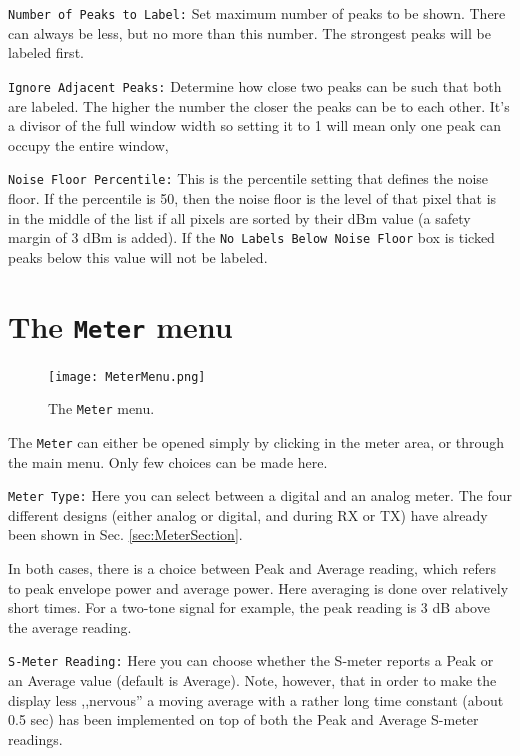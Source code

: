 \documentclass[12pt]{book}
\def\rett#1{\texttt{\color{red}#1}}
\def\bltt#1{\texttt{\color{blue}#1}}
\begin{document}
\rett{Number of Peaks to Label:} Set maximum number of peaks to be shown. There can always be less,
but no more than this number. The strongest peaks will be labeled first.

\rett{Ignore Adjacent Peaks:} Determine how close two peaks can be such that both are labeled.
The higher the number the closer the peaks can be to each other. It's a divisor of the
full window width so setting it to 1 will mean only one peak can occupy the entire window,

\rett{Noise Floor Percentile:} This is the percentile setting that defines the noise floor. If the
percentile is 50, then the noise floor is the level of that pixel that is in the middle of the list
if all pixels are sorted by their dBm value (a safety margin of 3 dBm is added).
If the \rett{No Labels Below Noise Floor} box is ticked
peaks below this value will not be labeled.


\section{The \texttt{Meter} menu}

\begin{figure}[ht]
\center
\texttt{[image: MeterMenu.png]}
\caption{The \bltt{Meter} menu.}
\label{fig:Meter}
\end{figure}

The \bltt{Meter} can either be opened simply by clicking in the meter
area, or through the main menu. Only few choices can be made here.

\rett{Meter Type:} Here you can select between a digital and an analog
meter. The four different designs (either analog or digital, and during
RX or TX) have already been shown in Sec. \ref{sec:MeterSection}.

In both cases, there is a choice between Peak and Average reading, which
refers to peak envelope power and average power. Here averaging is done
over relatively short times. For a two-tone signal for example, the peak
reading is 3 dB above the average reading.

\rett{S-Meter Reading:} Here you can choose whether the S-meter reports
a Peak or an Average value (default is Average).
Note, however, that in order to make the
display less ,,nervous'' a moving average with a rather long time constant
(about 0.5 sec) has been implemented on top of both the Peak and Average
S-meter readings.
\end{document}
